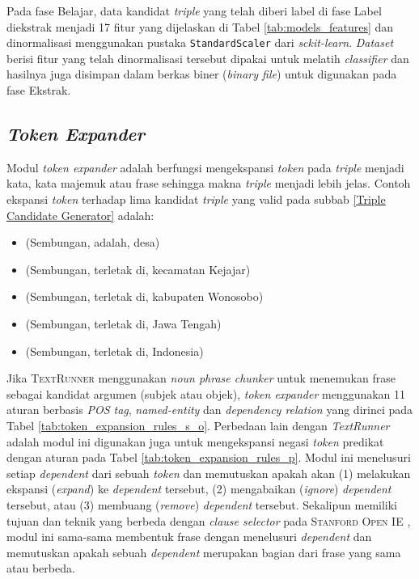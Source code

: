 Pada fase Belajar, data kandidat \textit{triple} yang telah diberi label di fase Label diekstrak menjadi 17 fitur yang dijelaskan di Tabel \ref{tab:models_features} dan dinormalisasi menggunakan pustaka \verb|StandardScaler| dari \textit{sckit-learn}. \textit{Dataset} berisi fitur yang telah dinormalisasi tersebut dipakai untuk melatih \textit{classifier} dan hasilnya juga disimpan dalam berkas biner (\textit{binary file}) untuk digunakan pada fase Ekstrak.

\subsection{\textit{Token Expander}}

Modul \textit{token expander} adalah berfungsi mengekspansi \textit{token} pada \textit{triple} menjadi kata, kata majemuk atau frase sehingga makna \textit{triple} menjadi lebih jelas. Contoh ekspansi \textit{token} terhadap lima kandidat \textit{triple} yang valid pada subbab \ref{Triple Candidate Generator} adalah:

\begin{itemize}
\item (Sembungan, adalah, desa)
\item (Sembungan, terletak di, kecamatan Kejajar)
\item (Sembungan, terletak di, kabupaten Wonosobo)
\item (Sembungan, terletak di, Jawa Tengah)
\item (Sembungan, terletak di, Indonesia)
\end{itemize}

Jika \textsc{TextRunner} menggunakan \textit{noun phrase chunker} \citep{banko2007open} untuk menemukan frase sebagai kandidat argumen (subjek atau objek), \textit{token expander} menggunakan 11 aturan berbasis \textit{POS tag}, \textit{named-entity} dan \textit{dependency relation} yang dirinci pada Tabel \ref{tab:token_expansion_rules_s_o}. Perbedaan lain dengan \textit{TextRunner} adalah modul ini digunakan juga untuk mengekspansi negasi \textit{token} predikat dengan aturan pada Tabel \ref{tab:token_expansion_rules_p}. Modul ini menelusuri setiap \textit{dependent} dari sebuah \textit{token} dan memutuskan apakah akan (1) melakukan ekspansi (\textit{expand}) ke \textit{dependent} tersebut, (2) mengabaikan (\textit{ignore}) \textit{dependent} tersebut, atau (3) membuang (\textit{remove}) \textit{dependent} tersebut. Sekalipun memiliki tujuan dan teknik yang berbeda dengan \textit{clause selector} pada \textsc{Stanford Open IE} \citep{angeli2015leveraging}, modul ini sama-sama membentuk frase dengan menelusuri \textit{dependent} dan memutuskan apakah sebuah \textit{dependent} merupakan bagian dari frase yang sama atau berbeda.



